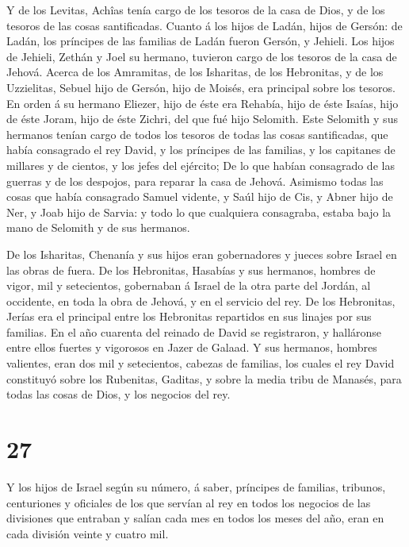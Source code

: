  Y de los Levitas, Achîas tenía cargo de los tesoros de la
casa de Dios, y de los tesoros de las cosas santificadas. 
Cuanto á los hijos de Ladán, hijos de Gersón: de Ladán, los príncipes de
las familias de Ladán fueron Gersón, y Jehieli.  Los hijos
de Jehieli, Zethán y Joel su hermano, tuvieron cargo de los tesoros de
la casa de Jehová.  Acerca de los Amramitas, de los
Isharitas, de los Hebronitas, y de los Uzzielitas,  Sebuel
hijo de Gersón, hijo de Moisés, era principal sobre los tesoros.
 En orden á su hermano Eliezer, hijo de éste era Rehabía,
hijo de éste Isaías, hijo de éste Joram, hijo de éste Zichri, del que
fué hijo Selomith.  Este Selomith y sus hermanos tenían
cargo de todos los tesoros de todas las cosas santificadas, que había
consagrado el rey David, y los príncipes de las familias, y los
capitanes de millares y de cientos, y los jefes del ejército;
 De lo que habían consagrado de las guerras y de los
despojos, para reparar la casa de Jehová.  Asimismo todas
las cosas que había consagrado Samuel vidente, y Saúl hijo de Cis, y
Abner hijo de Ner, y Joab hijo de Sarvia: y todo lo que cualquiera
consagraba, estaba bajo la mano de Selomith y de sus hermanos.

 De los Isharitas, Chenanía y sus hijos eran gobernadores y
jueces sobre Israel en las obras de fuera.  De los
Hebronitas, Hasabías y sus hermanos, hombres de vigor, mil y
setecientos, gobernaban á Israel de la otra parte del Jordán, al
occidente, en toda la obra de Jehová, y en el servicio del rey.
 De los Hebronitas, Jerías era el principal entre los
Hebronitas repartidos en sus linajes por sus familias. En el año
cuarenta del reinado de David se registraron, y halláronse entre ellos
fuertes y vigorosos en Jazer de Galaad.  Y sus hermanos,
hombres valientes, eran dos mil y setecientos, cabezas de familias, los
cuales el rey David constituyó sobre los Rubenitas, Gaditas, y sobre la
media tribu de Manasés, para todas las cosas de Dios, y los negocios del
rey.

\hypertarget{section-26}{%
\section{27}\label{section-26}}

 Y los hijos de Israel según su número, á saber, príncipes
de familias, tribunos, centuriones y oficiales de los que servían al rey
en todos los negocios de las divisiones que entraban y salían cada mes
en todos los meses del año, eran en cada división veinte y cuatro mil.

